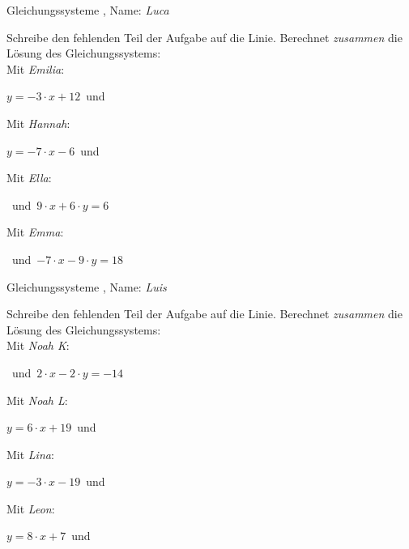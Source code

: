 \newpage
\begin{center}\large Gleichungssysteme
, Name: \emph{Luca}\end{center}
Schreibe den fehlenden Teil der Aufgabe auf die Linie. Berechnet \emph{zusammen} die Lösung des Gleichungssystems:
\\
\vfill Mit \emph{Emilia}:
\begin{center}$y=-3\cdot x+12$\mbox{ }und\mbox{ }\underline{}
\end{center}
\vfill Mit \emph{Hannah}:
\begin{center}$y=-7\cdot x-6$\mbox{ }und\mbox{ }\underline{}
\end{center}
\vfill Mit \emph{Ella}:
\begin{center}\underline{}
\mbox{ }und\mbox{ }$9\cdot x+6\cdot y=6$\end{center}
\vfill Mit \emph{Emma}:
\begin{center}\underline{}
\mbox{ }und\mbox{ }$-7\cdot x-9\cdot y=18$\end{center}
\newpage
\begin{center}\large Gleichungssysteme
, Name: \emph{Luis}\end{center}
Schreibe den fehlenden Teil der Aufgabe auf die Linie. Berechnet \emph{zusammen} die Lösung des Gleichungssystems:
\\
\vfill Mit \emph{Noah K}:
\begin{center}\underline{}
\mbox{ }und\mbox{ }$2\cdot x-2\cdot y=-14$\end{center}
\vfill Mit \emph{Noah L}:
\begin{center}$y=6\cdot x+19$\mbox{ }und\mbox{ }
\underline{}\end{center}
\vfill Mit \emph{Lina}:
\begin{center}$y=-3\cdot x-19$\mbox{ }und\mbox{ }\underline{}
\end{center}
\vfill Mit \emph{Leon}:
\begin{center}$y=8\cdot x+7$\mbox{ }und\mbox{ }\underline{}
\end{center}
